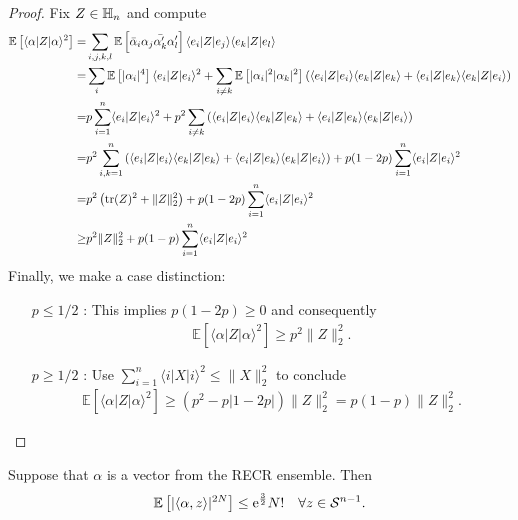 \begin{proof}
Fix $Z \in \mathbb{H}_n$ and compute
\begin{align*}
  \mathbb{E} \left[ \langle \alpha | Z | \alpha \rangle^2 \right]
  =& \sum_{i,j,k,l} \mathbb{E} \left[ \bar{\alpha}_i \alpha_j \bar{\alpha^\prime_k} \alpha^\prime_l \right] \langle  e_i|Z|  e_j \rangle \langle  e_k |Z|  e_l \rangle \\
  =& \sum_{i} \mathbb{E} \left[ | \alpha_i |^4 \right] \langle  e_i|Z| e_i \rangle^2 + \sum_{i \neq k} \mathbb{E} \left[ | \alpha_i |^2 | \alpha_k|^2 \right] \left( \langle  e_i|Z| e_i \rangle \langle  e_k|Z| e_k \rangle + \langle  e_i|Z| e_k \rangle \langle  e_k| Z| e_i \rangle \right) \\
  =& p \sum_{i=1}^n \langle  e_i|Z| e_i \rangle^2 + p^2 \sum_{i \neq k} \left( \langle  e_i|Z| e_i \rangle \langle  e_k|Z| e_k \rangle + \langle  e_i|Z| e_k \rangle \langle  e_k |Z|  e_i\rangle \right) \\
  =& p^2 \sum_{i,k=1}^n \left( \langle  e_i|Z| e_i \rangle \langle  e_k|Z| e_k \rangle + \langle  e_i|Z| e_k \rangle \langle  e_k |Z|  e_i\rangle \right) + p(1-2 p) \sum_{i=1}^n \langle  e_i|Z| e_i \rangle^2 \\
  =& p^2 \left( \operatorname{tr} (Z)^2 + \|Z\|_2^2 \right) + p (1-2 p) \sum_{i=1}^n \langle  e_i| Z |  e_i \rangle^2 \\
  \geq& p^2 \|Z\|_2^2 + p(1-p) \sum_{i=1}^n \langle  e_i |Z| e_i \rangle^2
\end{align*}
Finally, we make a case distinction:
\begin{itemize}
\item[$p \leq 1/2$]: This implies $p(1-2p) \geq 0$ and consequently
\begin{align*}
  \mathbb{E} \left[ \langle \alpha |Z| \alpha \rangle^2 \right] \geq p^2 \| Z \|_2^2.
\end{align*}
\item[$p \geq 1/2$]: Use $\sum_{i=1}^n \langle i| X|i \rangle^2 \leq \| X \|_2^2$ to conclude
\begin{align*}
  \mathbb{E} \left[ \langle \alpha | Z | \alpha \rangle^2 \right]
\geq ( p^2 - p|1-2p|) \|Z\|_2^2 = p(1-p) \| Z \|_2^2.
\end{align*}
\end{itemize}
\end{proof}

\begin{lemma}
Suppose that $\alpha$ is a vector from the RECR ensemble. Then
\begin{align*}
\mathbb{E} \left[ | \langle \alpha,  z \rangle|^{2N} \right] \leq \mathrm{e}^{\frac{3}{2}} N! \quad \forall  z \in \mathcal{S}^{n-1}.
\end{align*}
\end{lemma}

